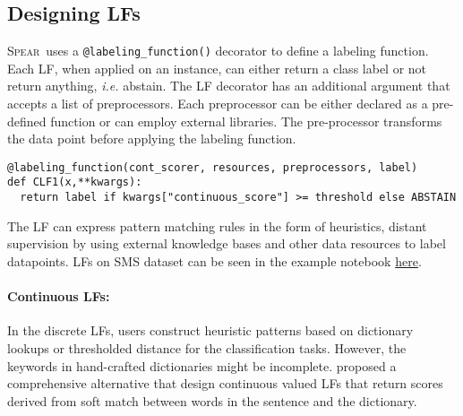 \documentclass[11pt]{article}
\newcommand{\spear}{\mbox{\textsc{Spear}}}
\begin{document}
\subsection{Designing LFs}
\spear\ uses a \texttt{@labeling\_function()} decorator to define a labeling function. Each LF, when applied on an instance, can either return a class label or not return anything, \textit{i.e.} abstain. The LF decorator has an additional argument that accepts a list of preprocessors. Each preprocessor can be either  declared  as  a  pre-defined  function  or  can employ external libraries. The pre-processor transforms the data point before applying the labeling function. 


\begin{lstlisting}
@labeling_function(cont_scorer, resources, preprocessors, label)
def CLF1(x,**kwargs):
  return label if kwargs["continuous_score"] >= threshold else ABSTAIN
\end{lstlisting}



The LF can express pattern matching rules in the form of heuristics, distant supervision by using external knowledge bases and other data resources to label datapoints. LFs on SMS dataset can be seen in the example notebook \href{https://github.com/decile-team/spear/blob/main/notebooks/SMS_SPAM/sms_labeling.ipynb}{here}.

\paragraph{Continuous LFs:} 
In the discrete LFs, users construct heuristic patterns based on dictionary lookups or thresholded distance for the classification tasks. However, the keywords in hand-crafted dictionaries might be incomplete. \citet{oishik} proposed a comprehensive alternative that design continuous valued LFs that return scores derived from soft match between words in the sentence and
the dictionary.
\end{document}
